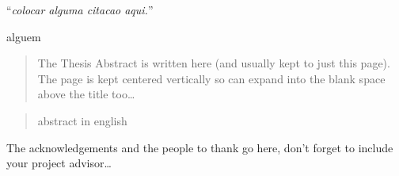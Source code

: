 \documentclass[
12pt, %
english, brazil, %
doublespacing,
nolistspacing, %
liststotoc, %
]{MastersDoctoralThesis} %
\begin{document}

\vspace*{0.2\textheight}

\noindent\enquote{\itshape colocar alguma citacao aqui.}\bigbreak

\hfill alguem
\cleardoublepage

\begin{abstract}
\addchaptertocentry{\abstractname} %

The Thesis Abstract is written here (and usually kept to just this page). The page is kept centered vertically so can expand into the blank space above the title too\ldots

\end{abstract}

\begin{abstract}
\addchaptertocentry{\abstractname}
abstract in english
\end{abstract}


\begin{acknowledgements}
\addchaptertocentry{\acknowledgementname} %

The acknowledgements and the people to thank go here, don't forget to include your project advisor\ldots

\end{acknowledgements}


\tableofcontents %

\listoffigures %
\listoftables %
\end{document}
